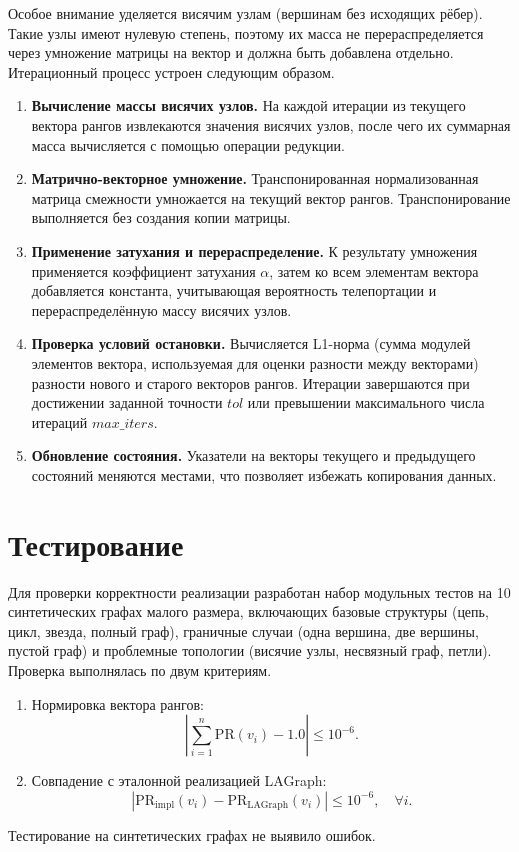 \documentclass[a4paper]{article}
\begin{document}
Особое внимание уделяется висячим узлам (вершинам без исходящих рёбер). Такие узлы имеют нулевую степень, поэтому их масса не перераспределяется через умножение матрицы на вектор и должна быть добавлена отдельно.
Итерационный процесс устроен следующим образом.
\begin{enumerate}
\item \textbf{Вычисление массы висячих узлов.} На каждой итерации из текущего вектора рангов извлекаются значения висячих узлов, после чего их суммарная масса вычисляется с помощью операции редукции.
\item \textbf{Матрично-векторное умножение.} Транспонированная нормализованная матрица смежности умножается на текущий вектор рангов. Транспонирование выполняется без создания копии матрицы.
\item \textbf{Применение затухания и перераспределение.} К результату умножения применяется коэффициент затухания $\alpha$, затем ко всем элементам вектора добавляется константа, учитывающая вероятность телепортации и перераспределённую массу висячих узлов.
\item \textbf{Проверка условий остановки.} Вычисляется L1-норма (сумма модулей элементов вектора, используемая для оценки разности между векторами) разности нового и старого векторов рангов. Итерации завершаются при достижении заданной точности $tol$ или превышении максимального числа итераций $max\_iters$.
\item \textbf{Обновление состояния.} Указатели на векторы текущего и предыдущего состояний меняются местами, что позволяет избежать копирования данных.
\end{enumerate}
\section{Тестирование}
Для проверки корректности реализации разработан набор модульных тестов на 10 синтетических графах малого размера, включающих базовые структуры (цепь, цикл, звезда, полный граф), граничные случаи (одна вершина, две вершины, пустой граф) и проблемные топологии (висячие узлы, несвязный граф, петли).
Проверка выполнялась по двум критериям.
\begin{enumerate}
\item Нормировка вектора рангов:
\begin{equation}
\left| \sum_{i=1}^{n} \text{PR}(v_i) - 1.0 \right| \leq 10^{-6}.
\end{equation}
\item Совпадение с эталонной реализацией LAGraph:
\begin{equation}
\left| \text{PR}_{\text{impl}}(v_i) - \text{PR}_{\text{LAGraph}}(v_i) \right| \leq 10^{-6}, \quad \forall i.
\end{equation}
\end{enumerate}
Тестирование на синтетических графах не выявило ошибок.
\end{document}
